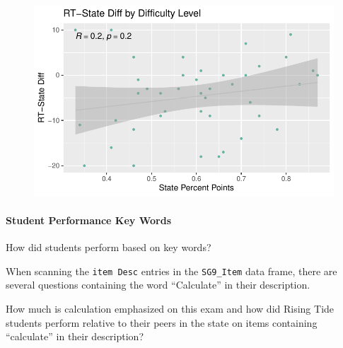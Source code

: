 \documentclass[
  letterpaper,
  DIV=11,
  numbers=noendperiod]{scrartcl}
\let\oldparagraph\paragraph
\renewcommand{\paragraph}[1]{\oldparagraph{#1}\mbox{}}
\begin{document}
\begin{figure}[H]

{\centering \includegraphics{theresaSzczepanski_final_files/figure-pdf/unnamed-chunk-19-1.pdf}

}

\end{figure}

\hypertarget{student-performance-key-words}{%
\paragraph{Student Performance Key
Words}\label{student-performance-key-words}}

How did students perform based on key words?

When scanning the \texttt{item\ Desc} entries in the \texttt{SG9\_Item}
data frame, there are several questions containing the word
``Calculate'' in their description.

How much is calculation emphasized on this exam and how did Rising Tide
students perform relative to their peers in the state on items
containing ``calculate'' in their description?
\end{document}
